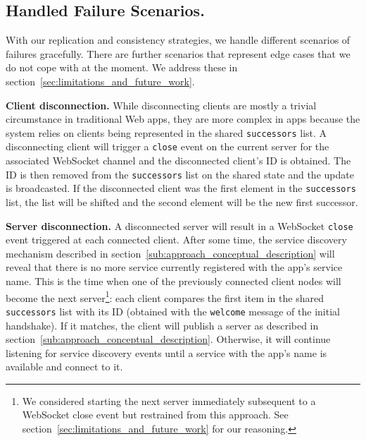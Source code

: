 \subsection{Handled Failure Scenarios.}
\label{sub:approach_handled_failure_scenarios}

With our replication and consistency strategies, we handle different scenarios of failures gracefully. There are further scenarios that represent edge cases that we do not cope with at the moment. We address these in section~\ref{sec:limitations_and_future_work}.

\textbf{Client disconnection.} While disconnecting clients are mostly a trivial circumstance in traditional Web apps, they are more complex in \APIshort apps because the system relies on clients being represented in the shared \texttt{successors} list. A disconnecting client will trigger a \texttt{close} event on the current server for the associated WebSocket channel and the disconnected client's ID is obtained. The ID is then removed from the \texttt{successors} list on the shared state and the update is broadcasted. If the disconnected client was the first element in the \texttt{successors} list, the list will be shifted and the second element will be the new first successor.

\textbf{Server disconnection.} A disconnected server will result in a WebSocket \texttt{close} event triggered at each connected client. After some time, the service discovery mechanism described in section~\ref{sub:approach_conceptual_description} will reveal that there is no more service currently registered with the app's service name. This is the time when one of the previously connected client nodes will become the next server\footnote{We considered starting the next server immediately subsequent to a WebSocket close event but restrained from this approach. See section~\ref{sec:limitations_and_future_work} for our reasoning.}: each client compares the first item in the shared \texttt{successors} list with its ID (obtained with the \texttt{welcome} message of the initial handshake). If it matches, the client will publish a server as described in section~\ref{sub:approach_conceptual_description}. Otherwise, it will continue listening for service discovery events until a service with the app's name is available and connect to it.

